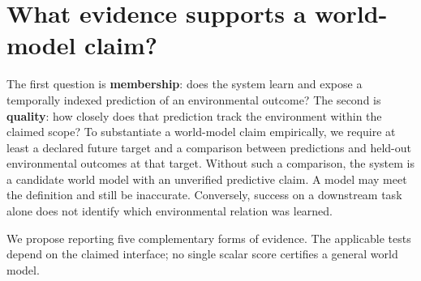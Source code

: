 \IfFileExists{IEEEtran.cls}{\documentclass[journal]{IEEEtran}}{\documentclass[twocolumn]{article}}
\begin{document}
\section{What evidence supports a world-model claim?}\label{what-evidence-supports-a-world-model-claim}

The first question is \textbf{membership}: does the system learn and expose a temporally indexed prediction of an environmental outcome? The second is \textbf{quality}: how closely does that prediction track the environment within the claimed scope? To substantiate a world-model claim empirically, we require at least a declared future target and a comparison between predictions and held-out environmental outcomes at that target. Without such a comparison, the system is a candidate world model with an unverified predictive claim. A model may meet the definition and still be inaccurate. Conversely, success on a downstream task alone does not identify which environmental relation was learned.

We propose reporting five complementary forms of evidence. The applicable tests depend on the claimed interface; no single scalar score certifies a general world model.
\end{document}
